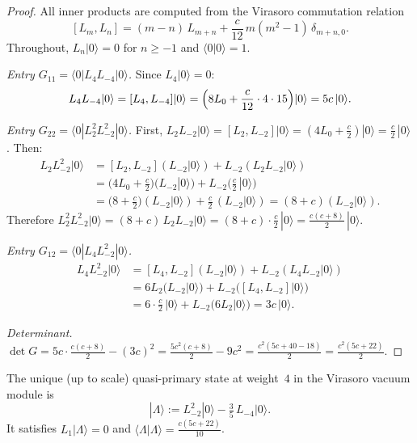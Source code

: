 \documentclass[11pt]{article}
\begin{document}
\begin{proof}
All inner products are computed from the Virasoro commutation
relation
\[
[L_m, L_n] = (m-n)\,L_{m+n} + \frac{c}{12}\,m(m^2-1)\,\delta_{m+n,0}.
\]
Throughout, $L_n|0\rangle = 0$ for $n \geq -1$ and $\langle 0|0\rangle = 1$.

\emph{Entry $G_{11} = \langle 0| L_4 L_{-4} |0\rangle$.}
Since $L_4|0\rangle = 0$:
\[
L_4 L_{-4}|0\rangle = [L_4, L_{-4}]|0\rangle
= \Bigl(8L_0 + \frac{c}{12}\cdot 4 \cdot 15\Bigr)|0\rangle
= 5c\,|0\rangle.
\]

\emph{Entry $G_{22} = \langle 0| L_2^2 L_{-2}^2 |0\rangle$.}
First, $L_2 L_{-2}|0\rangle = [L_2, L_{-2}]|0\rangle
= (4L_0 + \frac{c}{2})|0\rangle = \frac{c}{2}\,|0\rangle$.
Then:
\begin{align*}
L_2 L_{-2}^2|0\rangle
&= [L_2, L_{-2}](L_{-2}|0\rangle) + L_{-2}(L_2 L_{-2}|0\rangle) \\
&= \bigl(4L_0 + \tfrac{c}{2}\bigr)(L_{-2}|0\rangle)
  + L_{-2}\bigl(\tfrac{c}{2}\,|0\rangle\bigr) \\
&= \bigl(8 + \tfrac{c}{2}\bigr)(L_{-2}|0\rangle)
  + \tfrac{c}{2}\,(L_{-2}|0\rangle)
= (8+c)(L_{-2}|0\rangle).
\end{align*}
Therefore
$L_2^2 L_{-2}^2|0\rangle = (8+c)\,L_2 L_{-2}|0\rangle
= (8+c)\cdot\frac{c}{2}\,|0\rangle
= \frac{c(c+8)}{2}\,|0\rangle$.

\emph{Entry $G_{12} = \langle 0| L_4 L_{-2}^2 |0\rangle$.}
\begin{align*}
L_4 L_{-2}^2|0\rangle
&= [L_4, L_{-2}](L_{-2}|0\rangle) + L_{-2}(L_4 L_{-2}|0\rangle) \\
&= 6L_2(L_{-2}|0\rangle) + L_{-2}\bigl([L_4,L_{-2}]|0\rangle\bigr) \\
&= 6 \cdot \tfrac{c}{2}\,|0\rangle + L_{-2}(6 L_2|0\rangle)
= 3c\,|0\rangle.
\end{align*}

\emph{Determinant.}
$\det G = 5c \cdot \frac{c(c+8)}{2} - (3c)^2
= \frac{5c^2(c+8)}{2} - 9c^2
= \frac{c^2(5c+40-18)}{2} = \frac{c^2(5c+22)}{2}$.
\end{proof}

\begin{corollary}\label{cor:lambda-qp}
The unique (up to scale) quasi-primary state at weight~$4$ in
the Virasoro vacuum module is
\[
|\Lambda\rangle := L_{-2}^2|0\rangle - \tfrac{3}{5}\,L_{-4}|0\rangle.
\]
It satisfies $L_1|\Lambda\rangle = 0$ and
$\langle\Lambda|\Lambda\rangle = \frac{c(5c+22)}{10}$.
\end{corollary}
\end{document}
